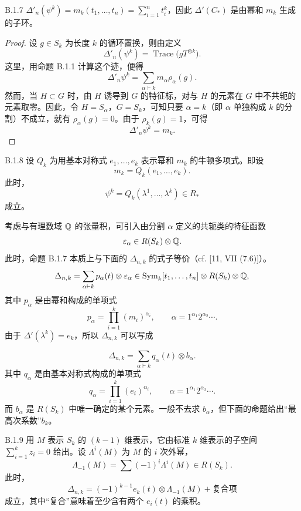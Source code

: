 \begin{proposition*}{B.1.7}
  $\Delta'_n(\psi^k)=m_k(t_1,\ldots,t_n)=\sum_{i=1}^n t_i^k$，因此 $\Delta'(C_*)$ 是由幂和 $m_k$ 生成的子环。
\end{proposition*}

\begin{proof}
  设 $g\in S_k$ 为长度 $k$ 的循环置换，则由定义
  \[
    \Delta'_n(\psi^k) = \operatorname{Trace}\bigl(gT^{\otimes k}\bigr).
  \]
  这里，用命题 B.1.1 计算这个迹，便得
  \[
    \Delta'_n\psi^k = \sum_{\alpha\vdash k} m_\alpha\rho_\alpha(g).
  \]
  然而，当 $H\subset G$ 时，由 $H$ 诱导到 $G$ 的特征标，对与 $H$ 的元素在 $G$ 中不共轭的元素取零。因此，令 $H=S_\alpha$，$G=S_k$，可知只要 $\alpha=k$（即 $\alpha$ 单独构成 $k$ 的分割）不成立，就有 $\rho_\alpha(g)=0$。由于 $\rho_k(g)=1$，可得
  \[
    \Delta'_n\psi^k = m_k.
  \]
\end{proof}

\begin{corollary*}{B.1.8}
  设 $Q_k$ 为用基本对称式 $e_1,\ldots,e_k$ 表示幂和 $m_k$ 的牛顿多项式。即设
  \[
    m_k = Q_k(e_1,\ldots,e_k).
  \]
  此时，
  \[
    \psi^k = Q_k(\lambda^1,\ldots,\lambda^k)\in R_*
  \]
  成立。
\end{corollary*}

考虑与有理数域 $\mathbb{Q}$ 的张量积，可引入由分割 $\alpha$ 定义的共轭类的特征函数
\[
  \varepsilon_\alpha\in R(S_k)\otimes\mathbb{Q}.
\]
此时，命题 B.1.7 本质上与下面的 $\Delta_{n,k}$ 的式子等价（cf. [11, VII (7.6)]）。
\[
  \Delta_{n,k} = \sum_{\alpha\vdash k} p_\alpha(t)\otimes\varepsilon_\alpha
  \in \operatorname{Sym}_k[t_1,\ldots,t_n]\otimes R(S_k)\otimes\mathbb{Q},
\]
其中 $p_\alpha$ 是由幂和构成的单项式
\[
  p_\alpha = \prod_{i=1}^k (m_i)^{\alpha_i},\qquad
  \alpha = 1^{\alpha_1}2^{\alpha_2}\cdots.
\]
由于 $\Delta'(\lambda^k)=e_k$，所以 $\Delta_{n,k}$ 可以写成

\[
  \Delta_{n,k} = \sum_{\alpha\vdash k} q_\alpha(t)\otimes b_\alpha.
\]
其中 $q_\alpha$ 是由基本对称式构成的单项式
\[
  q_\alpha = \prod_{i=1}^k (e_i)^{\alpha_i},\qquad
  \alpha = 1^{\alpha_1}2^{\alpha_2}\cdots.
\]
而 $b_\alpha$ 是 $R(S_k)$ 中唯一确定的某个元素。一般不去求 $b_\alpha$，但下面的命题给出“最高次系数”$b_k$。

\begin{proposition*}{B.1.9}
  用 $M$ 表示 $S_k$ 的 $(k-1)$ 维表示，它由标准 $k$ 维表示的子空间 $\sum_{i=1}^k z_i=0$ 给出。设 $\Lambda^i(M)$ 为 $M$ 的 $i$ 次外幂，
  \[
    \Lambda_{-1}(M) = \sum (-1)^i\Lambda^i(M)\in R(S_k).
  \]
  此时，
  \[
    \Delta_{n,k} = (-1)^{k-1}e_k(t)\otimes\Lambda_{-1}(M) + \text{复合项}
  \]
  成立，其中“复合”意味着至少含有两个 $e_i(t)$ 的乘积。
\end{proposition*}

